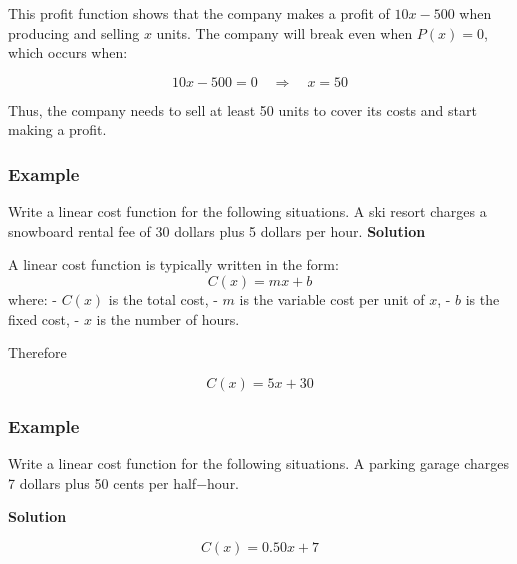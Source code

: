 This profit function shows that the company makes a profit of \( 10x - 500 \) when producing and selling \( x \) units. The company will break even when \( P(x) = 0 \), which occurs when:

\[
10x - 500 = 0 \quad \Rightarrow \quad x = 50
\]

Thus, the company needs to sell at least 50 units to cover its costs and start making a profit.

\subsubsection*{Example }
Write a linear cost function for the following situations. 
A ski resort charges a snowboard rental fee of 30 dollars
plus 5 dollars per hour.
\textbf{Solution}

A linear cost function is typically written in the form:
\[
C(x) = mx + b
\]
where:
- \( C(x) \) is the total cost,
- \( m \) is the variable cost per unit of \( x \),
- \( b \) is the fixed cost,
- \( x \) is the number of hours.

Therefore 

\[
C(x) = 5x + 30
\]

\subsubsection*{Example }
Write a linear cost function for the following situations.
A parking garage charges 7 dollars plus 50 cents per half$-$hour.



\textbf{Solution}

\[
C(x) = 0.50x + 7
\]


